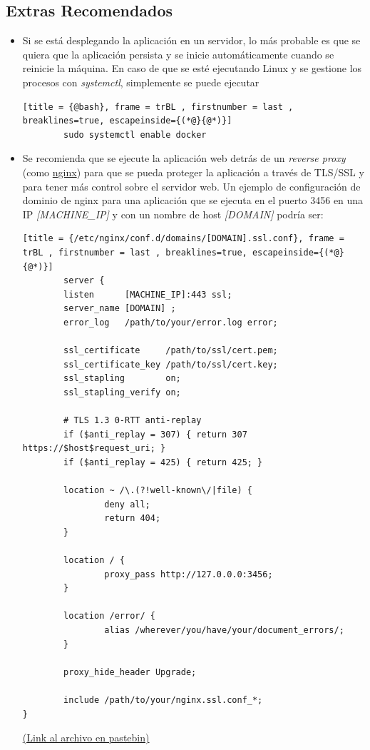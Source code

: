 \documentclass[12pt,epsf,titlepage,a4paper]{article}
\begin{document}
\subsection{Extras Recomendados}
\begin{itemize}
    \item Si se está desplegando la aplicación en un servidor, lo más probable es que se quiera que la aplicación persista y se inicie automáticamente cuando se reinicie la máquina. En caso de que se esté ejecutando Linux y se gestione los procesos con \emph{systemctl}, simplemente se puede ejecutar
\begin{lstlisting}[title = {@bash}, frame = trBL , firstnumber = last , breaklines=true, escapeinside={(*@}{@*)}]
        sudo systemctl enable docker
    \end{lstlisting}
    \item Se recomienda que se ejecute la aplicación web detrás de un \emph{reverse proxy} (como \href{https://nginx.org}{nginx}) para que se pueda proteger la aplicación a través de TLS/SSL y para tener más control sobre el servidor web. Un ejemplo de configuración de dominio de nginx para una aplicación que se ejecuta en el puerto 3456 en una IP \emph{[MACHINE\_IP]} y con un nombre de host \emph{[DOMAIN]} podría ser:
    
    \begin{lstlisting}[title = {/etc/nginx/conf.d/domains/[DOMAIN].ssl.conf}, frame = trBL , firstnumber = last , breaklines=true, escapeinside={(*@}{@*)}]
        server {
        listen      [MACHINE_IP]:443 ssl;
        server_name [DOMAIN] ;
        error_log   /path/to/your/error.log error;

        ssl_certificate     /path/to/ssl/cert.pem;
        ssl_certificate_key /path/to/ssl/cert.key;
        ssl_stapling        on;
        ssl_stapling_verify on;

        # TLS 1.3 0-RTT anti-replay
        if ($anti_replay = 307) { return 307 https://$host$request_uri; }
        if ($anti_replay = 425) { return 425; }

        location ~ /\.(?!well-known\/|file) {
                deny all;
                return 404;
        }

        location / {
                proxy_pass http://127.0.0.0:3456;
        }

        location /error/ {
                alias /wherever/you/have/your/document_errors/;
        }

        proxy_hide_header Upgrade;

        include /path/to/your/nginx.ssl.conf_*;
}
    \end{lstlisting}
    \href{https://pastebin.com/raw/8jdqGXct}{\footnotesize{(Link al archivo en pastebin)}}
    
\end{itemize}
\end{document}
